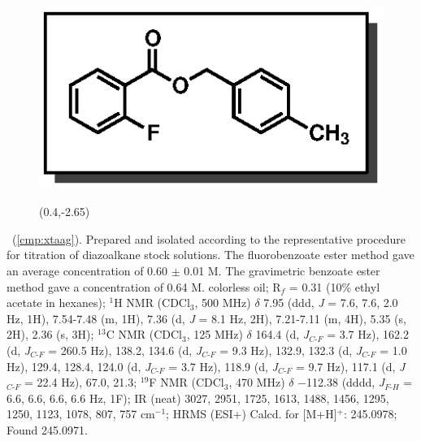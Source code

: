 \pagebreak
\begin{figure}
  \vspace{-18pt}
  \begin{center}
    \includegraphics[scale=0.8]{chp_asymmetric/images/xtaag}
          \begin{textblock}{1}(0.4,-2.65)  \end{textblock}
  \end{center}
  \vspace{-35pt}
\end{figure}\noindent \textbf{\CMPxtaag}\ (\ref{cmp:xtaag}). Prepared and
isolated according to the representative procedure for titration of diazoalkane
stock solutions. The fluorobenzoate ester method gave an average concentration
of 0.60 $\pm$ 0.01 M. The gravimetric benzoate ester method gave a concentration
of 0.64 M. colorless oil; R$_f$ = 0.31 (10\% ethyl acetate in hexanes); $^1$H
NMR (CDCl$_3$, 500 MHz) $\delta$ 7.95 (ddd, \textit{J} = 7.6, 7.6, 2.0 Hz, 1H),
7.54-7.48 (m, 1H), 7.36 (d, \textit{J} = 8.1 Hz, 2H), 7.21-7.11 (m, 4H), 5.35
(s, 2H), 2.36 (s, 3H); $^{13}$C NMR (CDCl$_3$, 125 MHz) $\delta$ 164.4 (d,
\textit{J}$_{C\mbox{-}F}$ = 3.7 Hz), 162.2 (d, \textit{J}$_{C\mbox{-}F}$ = 260.5
Hz), 138.2, 134.6 (d, \textit{J}$_{C\mbox{-}F}$ = 9.3 Hz), 132.9, 132.3 (d,
\textit{J}$_{C\mbox{-}F}$ = 1.0 Hz), 129.4, 128.4, 124.0 (d,
\textit{J}$_{C\mbox{-}F}$ = 3.7 Hz), 118.9 (d, \textit{J}$_{C\mbox{-}F}$ = 9.7
Hz), 117.1 (d, \textit{J}$_{C\mbox{-}F}$ = 22.4 Hz), 67.0, 21.3; $^{19}$F NMR
(CDCl$_3$, 470 MHz) $\delta$ $-$112.38 (dddd, \textit{J}$_{F\mbox{-}H}$ = 6.6,
6.6, 6.6, 6.6 Hz, 1F); IR (neat) 3027, 2951, 1725, 1613, 1488, 1456, 1295, 1250,
1123, 1078, 807, 757 cm$^{-1}$; HRMS (ESI+) Calcd. for  [M+H]$^+$:
245.0978; Found 245.0971.

